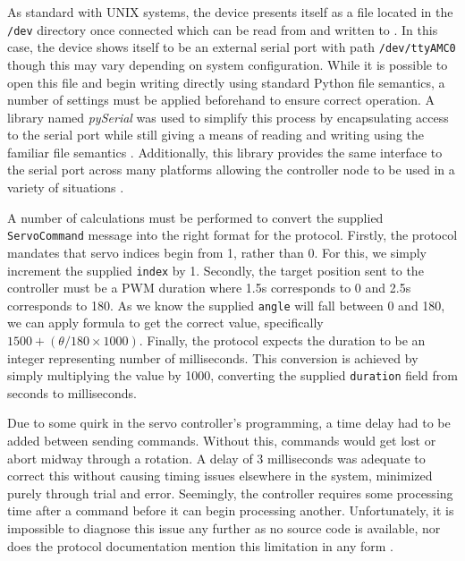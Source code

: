 As standard with UNIX systems, the device presents itself as a file located in the \texttt{/dev} directory once connected which can be read from and written to \cite{unix_devices}. In this case, the device shows itself to be an external serial port with path \texttt{/dev/ttyAMC0} though this may vary depending on system configuration. While it is possible to open this file and begin writing directly using standard Python file semantics, a number of settings must be applied beforehand to ensure correct operation. A library named \emph{pySerial} was used to simplify this process by encapsulating access to the serial port while still giving a means of reading and writing using the familiar file semantics \cite{pyserial}. Additionally, this library provides the same interface to the serial port across many platforms allowing the controller node to be used in a variety of situations \cite{pyserial}.

A number of calculations must be performed to convert the supplied \texttt{ServoCommand} message into the right format for the protocol. Firstly, the protocol mandates that servo indices begin from 1, rather than 0. For this, we simply increment the supplied \texttt{index} by 1. Secondly, the target position sent to the controller must be a PWM duration where 1.5\textmu{}s corresponds to 0\textdegree{} and 2.5\textmu{}s corresponds to 180\textdegree{}. As we know the supplied \texttt{angle} will fall between 0 and 180, we can apply formula to get the correct value, specifically $1500 + (\theta / 180 \times 1000)$. Finally, the protocol expects the duration to be an integer representing number of milliseconds. This conversion is achieved by simply multiplying the value by 1000, converting the supplied \texttt{duration} field from seconds to milliseconds.

Due to some quirk in the servo controller's programming, a time delay had to be added between sending commands. Without this, commands would get lost or abort midway through a rotation. A delay of 3 milliseconds was adequate to correct this without causing timing issues elsewhere in the system, minimized purely through trial and error. Seemingly, the controller requires some processing time after a command before it can begin processing another. Unfortunately, it is impossible to diagnose this issue any further as no source code is available, nor does the protocol documentation mention this limitation in any form \cite{torobot_manual}.


